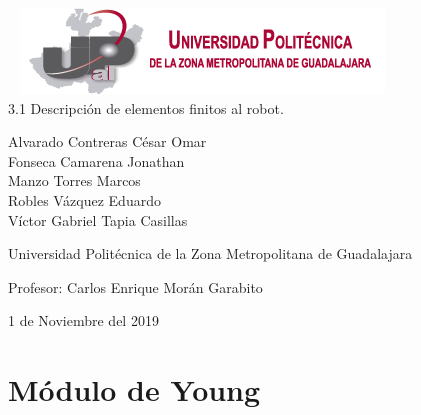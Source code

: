 \documentclass[11pt,a4paper,oldfontcommands,oneside]{memoir}
\begin{document}
\thispagestyle{empty}
\sffamily
\centering
\Large

~\vspace{\fill}
\includegraphics[scale=.85]{logo1.png} \\
{\huge 
\vspace{4cm}
3.1 Descripción de elementos finitos al robot.
}
\vspace{2.5cm}

{\LARGE

Alvarado Contreras César Omar\\
Fonseca Camarena Jonathan\\
Manzo Torres Marcos\\
Robles Vázquez Eduardo\\
Víctor Gabriel Tapia Casillas
}

\vspace{3.5cm}

Universidad Politécnica de la Zona Metropolitana de Guadalajara

\vspace{2.5cm}

Profesor: Carlos Enrique Morán Garabito

\vspace{\fill}

1 de Noviembre del 2019



\vspace{.5cm}
\hfill\break




\tableofcontents*

\clearpage

\chapter{Módulo de Young}
\end{document}

